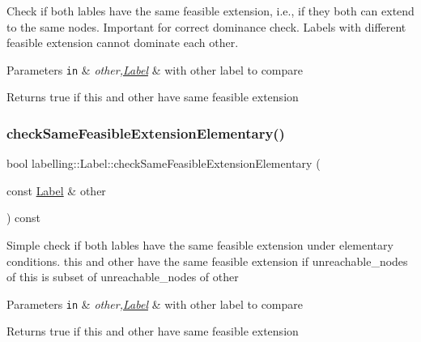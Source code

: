 Check if both lables have the same feasible extension, i.\+e., if they both can extend to the same nodes. Important for correct dominance check. Labels with different feasible extension cannot dominate each other. 
\begin{DoxyParams}[1]{Parameters}
\mbox{\tt in}  & {\em other,\hyperlink{classlabelling_1_1Label}{Label}} & with other label to compare \\
\hline
\end{DoxyParams}
\begin{DoxyReturn}{Returns}
true if this and other have same feasible extension 
\end{DoxyReturn}
\mbox{\label{classlabelling_1_1Label_a333b6fc9dba864b3df2cdf530a055aa7}} 
\subsubsection{\texorpdfstring{check\+Same\+Feasible\+Extension\+Elementary()}{checkSameFeasibleExtensionElementary()}}
{\footnotesize\ttfamily bool labelling\+::\+Label\+::check\+Same\+Feasible\+Extension\+Elementary (\begin{DoxyParamCaption}\item[{const \hyperlink{classlabelling_1_1Label}{Label} \&}]{other }\end{DoxyParamCaption}) const}

Simple check if both lables have the same feasible extension under elementary conditions. this and other have the same feasible extension if unreachable\+\_\+nodes of this is subset of unreachable\+\_\+nodes of other 
\begin{DoxyParams}[1]{Parameters}
\mbox{\tt in}  & {\em other,\hyperlink{classlabelling_1_1Label}{Label}} & with other label to compare \\
\hline
\end{DoxyParams}
\begin{DoxyReturn}{Returns}
true if this and other have same feasible extension 
\end{DoxyReturn}
\mbox{\label{classlabelling_1_1Label_a5c8dc87a89577d00ccf86251867ec76a}} 
